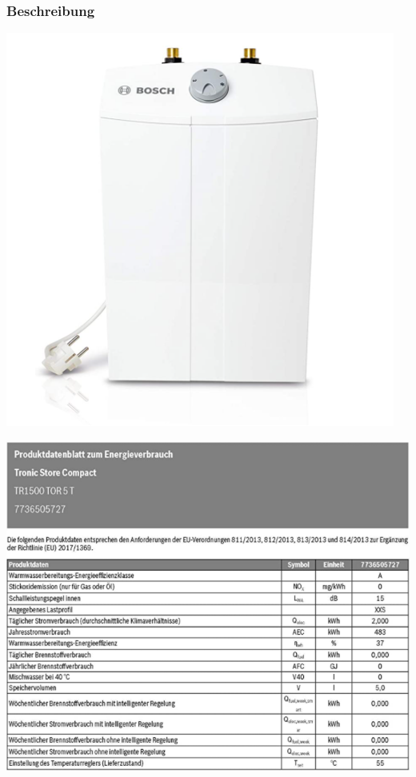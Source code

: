 \documentclass{beamer}
\begin{document}
\frame
{
  \frametitle{Beschreibung}

 \begin{minipage}[t]{0.45\linewidth}
 \centering
 \includegraphics[width=.75\linewidth]{Kleinspeicher.png}
 \end{minipage}
 \hfill
 \begin{minipage}[t]{0.45\linewidth}
 \centering
 \includegraphics[width=1\linewidth]{Produktdatenblatt.png}
 \end{minipage} 
}
\end{document}

